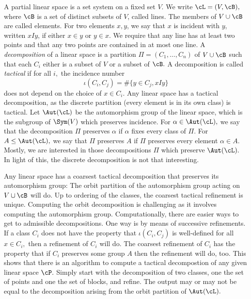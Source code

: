 A partial linear space is a set system on a fixed set $V$. 
We write $\cL=(V,\cB),$ 
where $\cB$ is a set of distinct subsets of $V$, called lines. 
The members of $V \cup \cB$ are called elements. 
For two elements $x,y$, we say that $x$ is incident with $y$, written $xIy$, 
if either $x \in y$ or $y \in x.$
We require that any line has at least two points 
and that any two points are contained in at most one line. 
A {\em decomposition} of a linear space 
is a partition $\Pi= (C_1,\ldots,C_n)$ of $V \cup \cB$ 
such that each $C_i$ either is a subset of $V$ or a subset of $\cB.$
A decomposition is called {\em tactical} if for all $i,$ the incidence number 
$$
\iota(C_i,C_j) = \# \{y \in C_j, xIy\}
$$
does not depend on the choice of $x \in C_i.$
Any linear space has a tactical decomposition, 
as the discrete partition (every element is in its own class) 
is tactical. 
Let $\Aut(\cL)$ be the automorphism group of the linear space, 
which is the subgroup of 
$\Sym(V)$ which preserves incidence. 
For $\alpha \in \Aut(\cL),$ we say that 
the decomposition $\Pi$ preserves $\alpha$ if $\alpha$ fixes every class of $\Pi.$ 
For $A \le  \Aut(\cL),$ we say that $\Pi$ preserves $A$ 
if $\Pi$ preserves every element $\alpha \in A.$
Mostly, we are interested in those decompositions $\Pi$ which preserve $\Aut(\cL).$
In light of this, 
the discrete decomposition is not that interesting. 

\bigskip


Any linear space has a coarsest tactical decomposition 
that preserves its automorphism group: 
The orbit partition of the automorphism group acting on $V \cup \cB$ will do. 
Up to ordering of the classes, the coarsest tactical refinement is unique.
Computing the orbit decomposition is challenging 
as it involves computing the automorphism group. 
Computationally, there are easier ways to get to admissible decompositions. 
One way is by means of successive refinements. 
If a class $C_i$ does not have the property that $\iota(C_i,C_j)$ is well-defined 
for all $x \in C_i,$ then a refinement of $C_i$ will do. 
The coarsest refinement of $C_i$ has the property that 
if $C_i$ preserves some group $A$ then the refinement will do, too.
This shows that there is an algorithm to compute 
a tactical decompostion of any given linear space $\cP.$ 
Simply start with the decomposition of two classes, 
one the set of points and one the set of blocks, and refine. 
The output may or may not be equal to the decomposition 
arising from the orbit partition of $\Aut(\cL).$

\bigskip

